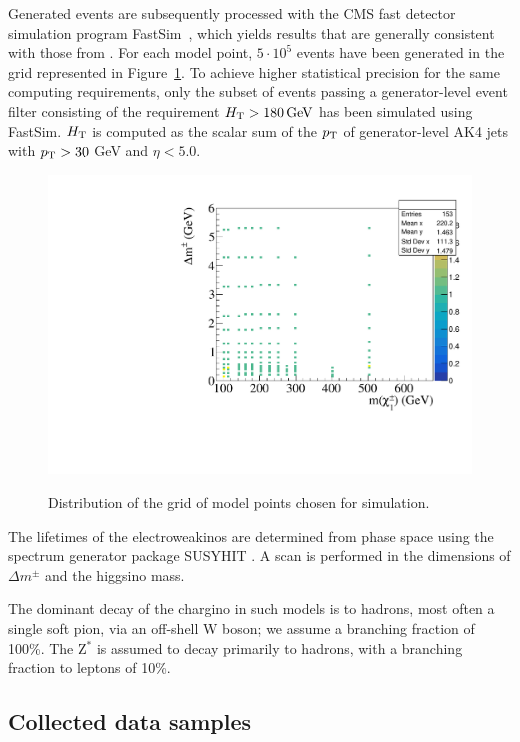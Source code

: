 Generated events are subsequently processed with the CMS fast detector
simulation program FastSim~\cite{Abdullin:2011zz,Giammanco:2014bza},
which yields results that are generally consistent with those from {\GEANTfour}. For each model point,  $5\cdot 10^5$ events have been generated in the grid represented in Figure~\ref{fig:signal-scan-grid}. To achieve higher statistical precision for the same computing requirements, only the subset of events passing a generator-level event filter consisting of the requirement $H_{\mathrm{T}}>180 \,\text{Ge\hspace{-.08em}V}$ has been simulated using FastSim. $H_{\mathrm{T}}$ is computed as the scalar sum of the $p_{\mathrm{T}}$ of generator-level AK4 jets with $p_{\mathrm{T}}>30$ GeV and $\eta<5.0$.

\begin{figure}[!htb]
\centering
\includegraphics[width=0.80\linewidth]{plots/signal_scan/PureHiggsinoScan.pdf} \\
\caption[Distribution of the grid of model points chosen for simulation]{Distribution of the grid of model points chosen for simulation.}
\label{fig:signal-scan-grid}
\end{figure}

The lifetimes of the electroweakinos are determined from phase space using the spectrum generator package SUSYHIT \cite{Allanach:2001kg}. A scan is performed in the dimensions of $\Delta m^{\pm}$ and the higgsino mass.

The dominant decay of the chargino in such models is to hadrons, most often a single soft pion, via an off-shell W boson; we assume a branching fraction of 100\%. The Z$^{*}$ is assumed to decay primarily to hadrons, with a branching fraction to leptons of 10\%.

\subsection{Collected data samples}
\label{sec:data-samples}

